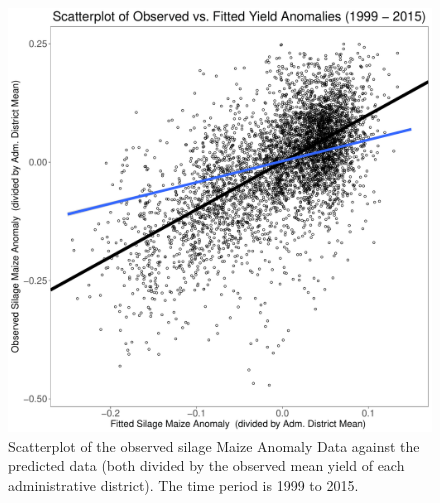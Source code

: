 \documentclass[12pt]{iopart}
\begin{document}
\begin{figure}
	\label{scatter:2f}
	\centering
	\includegraphics[width=1\textwidth]{figures/Train_1999-2015_norm.pdf}
	\caption{Scatterplot of the observed silage Maize Anomaly Data against the predicted data (both divided by the observed mean yield of each administrative district). The time period is 1999 to 2015.}
\end{figure}
\end{document}
